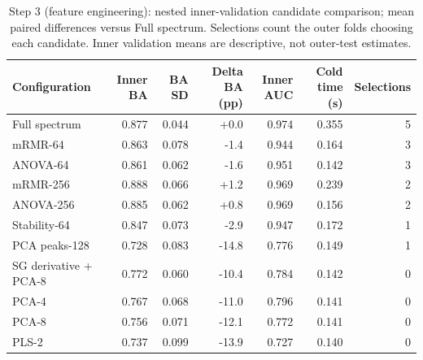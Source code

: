 \begin{table}[t]
\centering
\caption{Step 3 (feature engineering): nested inner-validation candidate comparison; mean paired differences versus Full spectrum. Selections count the outer folds choosing each candidate. Inner validation means are descriptive, not outer-test estimates.}
\label{tab:step3_candidates}
\footnotesize
\setlength{\tabcolsep}{4pt}
\begin{tabular}{lrrrrrr}
\toprule
Configuration & Inner BA & BA SD & Delta BA (pp) & Inner AUC & Cold time (s) & Selections \\
\midrule
Full spectrum & 0.877 & 0.044 & +0.0 & 0.974 & 0.355 & 5 \\
mRMR-64 & 0.863 & 0.078 & -1.4 & 0.944 & 0.164 & 3 \\
ANOVA-64 & 0.861 & 0.062 & -1.6 & 0.951 & 0.142 & 3 \\
mRMR-256 & 0.888 & 0.066 & +1.2 & 0.969 & 0.239 & 2 \\
ANOVA-256 & 0.885 & 0.062 & +0.8 & 0.969 & 0.156 & 2 \\
Stability-64 & 0.847 & 0.073 & -2.9 & 0.947 & 0.172 & 1 \\
PCA peaks-128 & 0.728 & 0.083 & -14.8 & 0.776 & 0.149 & 1 \\
SG derivative + PCA-8 & 0.772 & 0.060 & -10.4 & 0.784 & 0.142 & 0 \\
PCA-4 & 0.767 & 0.068 & -11.0 & 0.796 & 0.141 & 0 \\
PCA-8 & 0.756 & 0.071 & -12.1 & 0.772 & 0.141 & 0 \\
PLS-2 & 0.737 & 0.099 & -13.9 & 0.727 & 0.140 & 0 \\
\bottomrule
\end{tabular}
\end{table}
